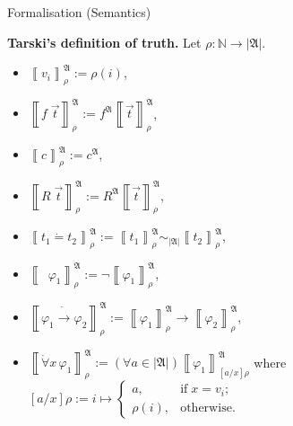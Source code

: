 \documentclass[serif,table,10pt]{beamer}
\newcommand{\IN}{\mathbb{N}}
\newcommand{\0}{\texttt{0}}
\newcommand{\1}{\texttt{1}}
\newcommand{\Leq}{\mathrel{\dot{=}}}
\newcommand{\Lneg}{\mathop{\dot{\neg}}}
\newcommand{\Lto}{\mathrel{\dot{\to}}}
\newcommand{\Lall}[1]{\dot{\forall}#1\,}
\begin{document}
\begin{frame}{Formalisation (Semantics)}

    \textbf{Tarski's definition of truth.}
    Let $ \rho : \IN \to | \mathfrak{A} | $.
    \begin{itemize}
        \item $ \left\llbracket v_i \right\rrbracket_\rho^\mathfrak{A} := \rho ( i ) $,
        \item $ \left\llbracket f \; \vec{t} \right\rrbracket_\rho^\mathfrak{A} := f^\mathfrak{A} \left\llbracket \vec{t} \right\rrbracket_\rho^\mathfrak{A} $,
        \item $ \left\llbracket c \right\rrbracket_\rho^\mathfrak{A} := c^\mathfrak{A} $,
        \item $ \left\llbracket R \; \vec{t} \right\rrbracket_\rho^\mathfrak{A} := R^\mathfrak{A} \left\llbracket \vec{t} \right\rrbracket_\rho^\mathfrak{A} $,
        \item $ \left\llbracket t_1 \Leq t_2 \right\rrbracket_\rho^\mathfrak{A} := \left\llbracket t_1 \right\rrbracket_\rho^\mathfrak{A} \sim_{| \mathfrak{A} |} \left\llbracket t_2 \right\rrbracket_\rho^\mathfrak{A} $,
        \item $ \left\llbracket \Lneg \varphi_1 \right\rrbracket_\rho^\mathfrak{A} := \lnot \left\llbracket \varphi_1 \right\rrbracket_\rho^\mathfrak{A} $,
        \item $ \left\llbracket \varphi_1 \Lto \varphi_2 \right\rrbracket_\rho^\mathfrak{A} := \left\llbracket \varphi_1 \right\rrbracket_\rho^\mathfrak{A} \to \left\llbracket \varphi_2 \right\rrbracket_\rho^\mathfrak{A} $,
        \item $ \left\llbracket \Lall{ x } \varphi_1 \right\rrbracket_\rho^\mathfrak{A} := ( \forall a \in | \mathfrak{A} | ) \left\llbracket \varphi_1 \right\rrbracket_{[a / x] \rho}^\mathfrak{A} $ where $ [a / x] \rho := i \mapsto \begin{cases} a , & \mathrm{if} \; x = v_i ; \\ \rho ( i ) , & \mathrm{otherwise} . \end{cases} $
    \end{itemize}

\end{frame}
\end{document}
